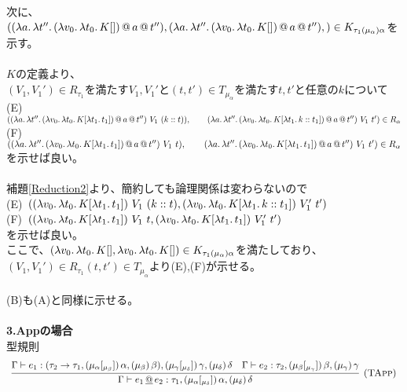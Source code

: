 次に、\\
$((\lambda{a}.\,{\lambda{t''}.\,{{{(\lambda{v_0}.\,{\lambda{t_0}.\,{K[]}})}\,@\,{a}}\,@\,{t''}}}),
  (\lambda{a}.\,{\lambda{t''}.\,{{{(\lambda{v_0}.\,{\lambda{t_0}.\,{K[]}})}\,@\,{a}}\,@\,{t''}}}),)\in K_{\tau_1(\mu_{\alpha})\alpha}$を示す。\\
  \\
  $K$の定義より、\\
  $(V_1, V_1')\in R_{\tau_1}$を満たす$V_1,V_1'$と$(t,t')\in T_{\mu_{\alpha}}$を満たす$t,t'$と任意の$k$について\\
  (E)\ $(\LamP{a}{\Lam{t''}{\App{\App{\LamP{v_0}{\Lam{t_0}{K[\Lam{t_1}{t_1}]}}}{a}}{t''}}}\ V_1\ (\Cons{k}{t})),\\
  \qquad \LamP{a}{\Lam{t''}{\App{\App{\LamP{v_0}{\Lam{t_0}{K[\Lam{t_1}{\Cons{k}{t_1}}]}}}{a}}{t''}}}\ V_1\ t')\in R_{\alpha}$\\
  (F)\ $(\LamP{a}{\Lam{t''}{\App{\App{\LamP{v_0}{\Lam{t_0}{K[\Lam{t_1}{t_1}]}}}{a}}{t''}}}\ V_1\ t),\\
  \qquad \LamP{a}{\Lam{t''}{\App{\App{\LamP{v_0}{\Lam{t_0}{K[\Lam{t_1}{t_1}]}}}{a}}{t''}}}\ V_1\ t')\in R_{\alpha}$\\
  を示せば良い。\\
  \\
  補題\ref{Reduction2}より、簡約しても論理関係は変わらないので\\
  (E)\ $(\LamP{v_0}{\Lam{t_0}{K[\Lam{t_1}{t_1}]}}\ V_1\ (\Cons{k}{t}), \LamP{v_0}{\Lam{t_0}{K[\Lam{t_1}{\Cons{k}{t_1}}]}}\ V_1'\ t')$\\
  (F)\ $((\lambda{v_0}.\,{\lambda{t_0}.\,{K[\lambda{t_1}.\,{t_1}]}})\ V_1\ t, (\lambda{v_0}.\,{\lambda{t_0}.\,{K[\lambda{t_1}.\,{t_1}]}})\ V_1'\ t')$\\
  を示せば良い。\\
  ここで、$(\lambda{v_0}.\,{\lambda{t_0}.\,{K[]}}, \lambda{v_0}.\,{\lambda{t_0}.\,{K[]}})\in  K_{\tau_1(\mu_{\alpha})\alpha}$を満たしており、\\
  $(V_1, V_1')\in R_{\tau_1} (t,t')\in T_{\mu_{\alpha}}$より(E),(F)が示せる。\\
  \\
  (B)も(A)と同様に示せる。
\\
\\  
\textbf{3.Appの場合}\\
型規則  
\[
\begin{array}{c}
  \infer[\TApp]
      {\JudgeTrail{\Gamma}{\DApp{e_1}{e_2}}
                  {\tau_1}{\TrailsType{\alpha}{\delta}}{\TrailType{\delta}}}
      {\JudgeTrail{\Gamma}{e_1}
                  {\ArrowTrailP{\tau_2}{\tau_1}{\TrailsType{\alpha}{\beta}}
                                               {\TrailType{\beta}}}
                  {\TrailsType{\gamma}{\delta}}
                  {\TrailType{\delta}}
      &\JudgeTrail{\Gamma}{e_2}{\tau_2}{\TrailsType{\beta}{\gamma}}{\TrailType{\gamma}}}
\end{array}
\]
